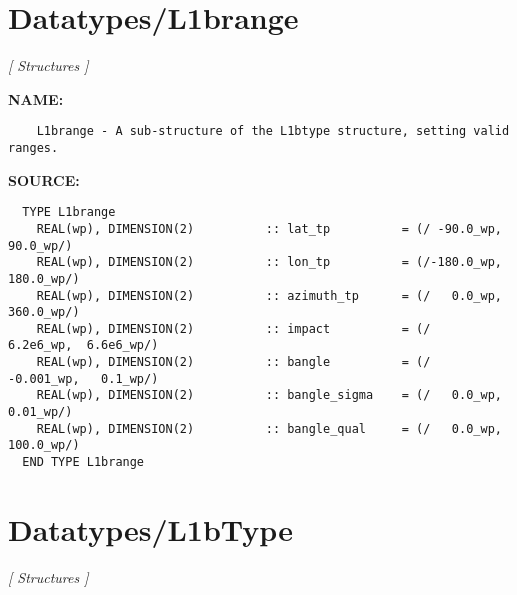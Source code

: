\section{Datatypes/L1brange}
\textsl{[ Structures ]}

\label{ch:robo34}
\label{ch:Datatypes_L1brange}
\textbf{NAME:}\hspace{0.08in}\begin{Verbatim}
    L1brange - A sub-structure of the L1btype structure, setting valid ranges.
\end{Verbatim}
\textbf{SOURCE:}\hspace{0.08in}\begin{Verbatim}
  TYPE L1brange
    REAL(wp), DIMENSION(2)          :: lat_tp          = (/ -90.0_wp,   90.0_wp/)
    REAL(wp), DIMENSION(2)          :: lon_tp          = (/-180.0_wp,  180.0_wp/)
    REAL(wp), DIMENSION(2)          :: azimuth_tp      = (/   0.0_wp,  360.0_wp/)
    REAL(wp), DIMENSION(2)          :: impact          = (/   6.2e6_wp,  6.6e6_wp/)
    REAL(wp), DIMENSION(2)          :: bangle          = (/  -0.001_wp,   0.1_wp/)
    REAL(wp), DIMENSION(2)          :: bangle_sigma    = (/   0.0_wp,    0.01_wp/)
    REAL(wp), DIMENSION(2)          :: bangle_qual     = (/   0.0_wp,  100.0_wp/)
  END TYPE L1brange
\end{Verbatim}
\section{Datatypes/L1bType}
\textsl{[ Structures ]}

